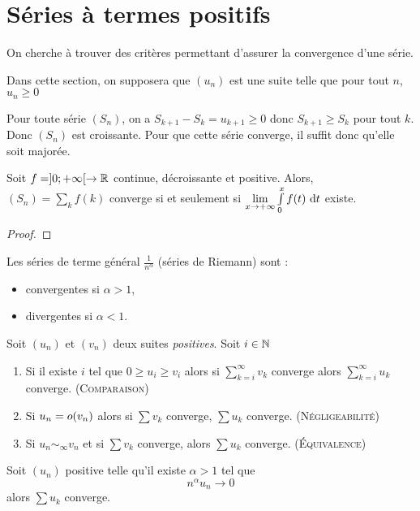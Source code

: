 \section{Séries à termes positifs}\label{serie_th_pos}
On cherche à trouver des critères permettant d'assurer la convergence d'une série.

Dans cette section, on supposera que $(u_n)$ est une suite telle que pour tout $n$, $u_n\geq0$

\begin{rem}
Pour toute série $(S_n)$, on a $S_{k+1}-S_k = u_{k+1}\geq0$ donc $S_{k+1}\geq S_k$ pour tout $k$. Donc $(S_n)$ est croissante. Pour que cette série converge, il suffit donc qu'elle soit majorée.
\end{rem}

\begin{prop}
Soit $f=]0;+\infty[\to\mathbb{R}$ continue, décroissante et positive. Alors, $(S_n) = \sum\limits_k f(k)$ converge si et seulement si $\lim\limits_{x\to+\infty}\int\limits_0^x f(t)\,\,\mathrm{d} t$ existe.
\end{prop}
\begin{proof}\end{proof}
\begin{prop}
Les séries de terme général $\frac{1}{n^\alpha}$ (séries de Riemann) sont :
\begin{itemize}
	\item convergentes si $\alpha>1$,
	\item divergentes si $\alpha<1$.
\end{itemize}
\end{prop}
\begin{prop}
Soit $(u_n)$ et $(v_n)$ deux suites \emph{positives}. Soit $i\in\mathbb{N}$
\begin{enumerate}
	\item Si il existe $i$ tel que $0 \geq u_i \geq v_i$ alors si $\sum\limits_{k=i}^\infty v_k$ converge alors $\sum\limits_{k=i}^\infty u_k$ converge. (\textsc{Comparaison})
	\item Si $u_n=o(v_n)$ alors si $\sum v_k$ converge, $\sum u_k$ converge. (\textsc{Négligeabilité})
	\item Si $u_n\sim_\infty v_n$ et si $\sum v_k$ converge, alors $\sum u_k$ converge. (\textsc{Équivalence})
\end{enumerate}
\end{prop}

\begin{appl}
Soit $(u_n)$ positive telle qu'il existe $\alpha > 1$ tel que
$$n^\alpha u_n\to0$$
alors $\sum u_k$ converge.
\end{appl}

